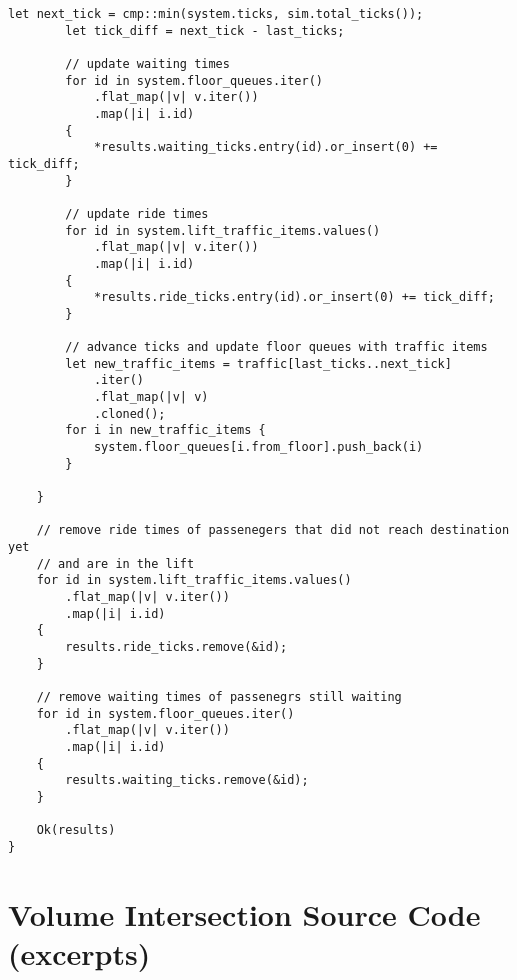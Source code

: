 \begin{lstlisting}[caption={Implementation of a single simulation run}, label={lst:app:simsinglerun}]
        let next_tick = cmp::min(system.ticks, sim.total_ticks());
        let tick_diff = next_tick - last_ticks;

        // update waiting times
        for id in system.floor_queues.iter()
            .flat_map(|v| v.iter())
            .map(|i| i.id)
        {
            *results.waiting_ticks.entry(id).or_insert(0) += tick_diff;
        }

        // update ride times
        for id in system.lift_traffic_items.values()
            .flat_map(|v| v.iter())
            .map(|i| i.id)
        {
            *results.ride_ticks.entry(id).or_insert(0) += tick_diff;
        }

        // advance ticks and update floor queues with traffic items
        let new_traffic_items = traffic[last_ticks..next_tick]
            .iter()
            .flat_map(|v| v)
            .cloned();
        for i in new_traffic_items {
            system.floor_queues[i.from_floor].push_back(i)
        }

    }

    // remove ride times of passenegers that did not reach destination yet
    // and are in the lift
    for id in system.lift_traffic_items.values()
        .flat_map(|v| v.iter())
        .map(|i| i.id)
    {
        results.ride_ticks.remove(&id);
    }

    // remove waiting times of passenegrs still waiting
    for id in system.floor_queues.iter()
        .flat_map(|v| v.iter())
        .map(|i| i.id)
    {
        results.waiting_ticks.remove(&id);
    }

    Ok(results)
}
\end{lstlisting}

\chapter{Volume Intersection Source Code (excerpts)}
\label{app:vol}

